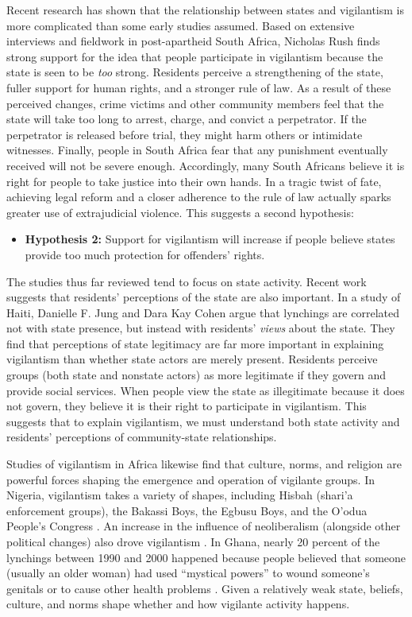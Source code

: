 \documentclass[12pt,ansiapaper]{article}
\begin{document}
Recent research has shown that the relationship between states and vigilantism is more complicated than some early studies assumed. Based on extensive interviews and fieldwork in post-apartheid South Africa, Nicholas Rush \citet{smith2019contradictions} finds strong support for the idea that people participate in vigilantism because the state is seen to be \textit{too} strong. Residents perceive a strengthening of the state, fuller support for human rights, and a stronger rule of law. As a result of these perceived changes, crime victims and other community members feel that the state will take too long to arrest, charge, and convict a perpetrator. If the perpetrator is released before trial, they might harm others or intimidate witnesses. Finally, people in South Africa fear that any punishment eventually received will not be severe enough. Accordingly, many South Africans believe it is right for people to take justice into their own hands. In a tragic twist of fate, achieving legal reform and a  closer adherence to the rule of law actually sparks greater use of extrajudicial violence. This suggests a second hypothesis:

\begin{itemize}
  \item \textbf{Hypothesis 2:} Support for vigilantism will increase if people believe states provide too much protection for offenders' rights. 
  \end{itemize}

The studies thus far reviewed tend to focus on state activity. Recent work suggests that residents' perceptions of the state are also important. In a study of Haiti, Danielle F. Jung and Dara Kay Cohen \citeyearpar[3]{jung2020lynching} argue that lynchings are correlated not with state presence, but instead with residents' \textit{views} about the state. They find that perceptions of state legitimacy are far more important in explaining vigilantism than whether state actors are merely present. Residents perceive groups (both state and nonstate actors) as more legitimate if they govern and provide social services. When people view the state as illegitimate because it does not govern, they believe it is their right to participate in vigilantism. This suggests that to explain vigilantism, we must understand both state activity and residents' perceptions of community-state relationships. 

Studies of vigilantism in Africa likewise find that culture, norms, and religion are powerful forces shaping the emergence and operation of vigilante groups. In Nigeria, vigilantism takes a variety of shapes, including Hisbah (shari'a enforcement groups), the Bakassi Boys, the Egbusu Boys, and the O'odua People's Congress \citep{pratten2008thief,last2008search, fourchard2008new}. An increase in the influence of neoliberalism (alongside other political changes) also drove vigilantism \citep[5]{pratten2008politics}. In Ghana, nearly 20 percent of the lynchings between 1990 and 2000 happened because people believed that someone (usually an older woman) had used ``mystical powers'' to wound someone's genitals or to cause other health problems  \citep[414]{adinkrah2005vigilante}. Given a relatively weak state, beliefs, culture, and norms shape whether and how vigilante activity happens.  
\end{document}
